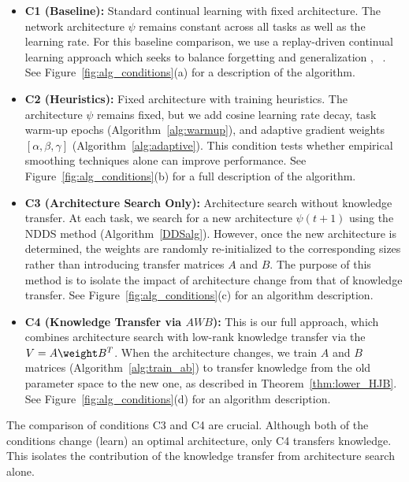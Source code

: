\begin{itemize}
    \item \textbf{C1 (Baseline):} Standard continual learning with fixed architecture. The network architecture $\psi$ remains constant across all tasks as well as the learning rate. For this baseline comparison, we use a replay-driven continual learning approach which seeks to balance forgetting and generalization \cite{raghavan2021formalizing}, ~\cite{raghavan2023learningcontinuallysequencegraphs}. See Figure~\ref{fig:alg_conditions}(a) for a description of the algorithm.


    \item \textbf{C2 (Heuristics):} Fixed architecture with training heuristics. The architecture $\psi$ remains fixed, but we add cosine learning rate decay, task warm-up epochs (Algorithm~\ref{alg:warmup}), and adaptive gradient weights $[\alpha, \beta, \gamma]$ (Algorithm~\ref{alg:adaptive}). This condition tests whether empirical smoothing techniques alone can improve performance. See Figure~\ref{fig:alg_conditions}(b) for a full description of the algorithm.

    \item \textbf{C3 (Architecture Search Only):} Architecture search without knowledge transfer. At each task, we search for a new architecture $\psi(t+1)$ using the NDDS method (Algorithm~\ref{DDSalg}). However, once the new architecture is determined, the weights are randomly re-initialized to the corresponding sizes rather than introducing transfer matrices $A$ and $B.$ The purpose of this method is to isolate the impact of architecture change from that of knowledge transfer. See Figure~\ref{fig:alg_conditions}(c) for an algorithm description.

    \item \textbf{C4 (Knowledge Transfer via $AWB$):} This is our full approach, which combines architecture search with low-rank knowledge transfer via the  $V = A \weight B^T$. When the architecture changes, we train $A$ and $B$ matrices (Algorithm~\ref{alg:train_ab}) to transfer knowledge from the old parameter space to the new one, as described in Theorem~\ref{thm:lower_HJB}. See Figure~\ref{fig:alg_conditions}(d) for an algorithm description.
\end{itemize}

The comparison of conditions C3 and C4 are crucial. Although both of the conditions change (learn) an optimal architecture, only C4 transfers knowledge. This isolates the contribution of the knowledge transfer from architecture search alone. 


